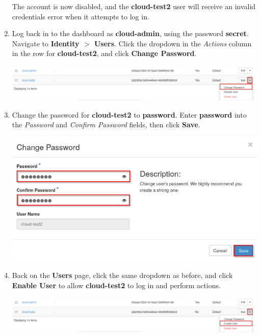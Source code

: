\documentclass[letterpaper, 12pt]{article}
\begin{document}
\begin{enumerate}
    \begin{notebox}
        The account is now disabled, and the \textbf{cloud-test2} user will receive an invalid credentials error when it attempts to log in.
    \end{notebox}

    \item Log back in to the dashboard as \textbf{cloud-admin}, using the password \textbf{secret}.
    Navigate to \textbf{Identity $>$ Users}.
    Click the dropdown in the \textit{Actions} column in the row for \textbf{cloud-test2}, and click \textbf{Change Password}.

    \begin{center}
        \includegraphics[width=\linewidth]{images/part3/step15.png}
    \end{center}

    \item Change the password for \textbf{cloud-test2} to \textbf{password}.
    Enter \textbf{password} into the
    \textit{Password} and \textit{Confirm Password} fields, then click \textbf{Save}.

    \begin{center}
        \includegraphics[width=\linewidth]{images/part3/step16.png}
    \end{center}

    \item Back on the \textbf{Users} page, click the same dropdown as before, and click \textbf{Enable User} to allow \textbf{cloud-test2} to log in and perform actions.

    \begin{center}
        \includegraphics[width=\linewidth]{images/part3/step17.png}
    \end{center}


\end{enumerate}
\end{document}
